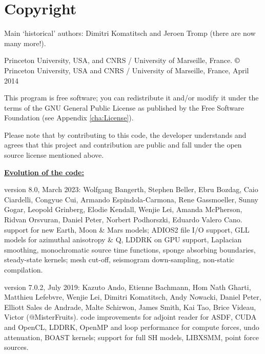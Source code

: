 \chapter*{Copyright}\label{cha:Copyright}

Main `historical' authors: Dimitri Komatitsch and Jeroen Tromp (there are now many more!).

Princeton University, USA, and CNRS / University of Marseille, France.\newline
$\copyright$ Princeton University, USA and CNRS / University of Marseille, France, April 2014\newline

\noindent
This program is free software; you can redistribute it and/or modify
it under the terms of the GNU General Public License as published
by the Free Software Foundation (see Appendix \ref{cha:License}).\newline

\noindent
Please note that by contributing to this code, the developer understands and agrees that this project and contribution
are public and fall under the open source license mentioned above.\newline

\noindent
\textbf{\underline{Evolution of the code:}}\newline

 version 8.0, March 2023:
   Wolfgang Bangerth, Stephen Beller, Ebru Bozdag, Caio Ciardelli, Congyue Cui, Armando Espindola-Carmona,
   Rene Gassmoeller, Sunny Gogar, Leopold Grinberg, Elodie Kendall, Wenjie Lei, Amanda McPherson, Ridvan Orsvuran,
   Daniel Peter, Norbert Podhorszki, Eduardo Valero Cano.
     support for new Earth, Moon \& Mars models; ADIOS2 file I/O support, GLL models for azimuthal anisotropy \& Q,
     LDDRK on GPU support, Laplacian smoothing, monochromatic source time functions, sponge absorbing boundaries,
     steady-state kernels; mesh cut-off, seismogram down-sampling, non-static compilation.\newline

 version 7.0.2, July 2019:
   Kazuto Ando, Etienne Bachmann, Hom Nath Gharti, Matthieu Lefebvre, Wenjie Lei, Dimitri Komatitsch, Andy Nowacki,
   Daniel Peter, Elliott Sales de Andrade, Malte Schirwon, James Smith, Kai Tao, Brice Videau, Victor (@MisterFruits).
     code improvements for adjoint reader for ASDF, CUDA and OpenCL, LDDRK, OpenMP and loop performance for compute forces,
     undo attenuation, BOAST kernels; support for full SH models, LIBXSMM, point force sources.\newline

